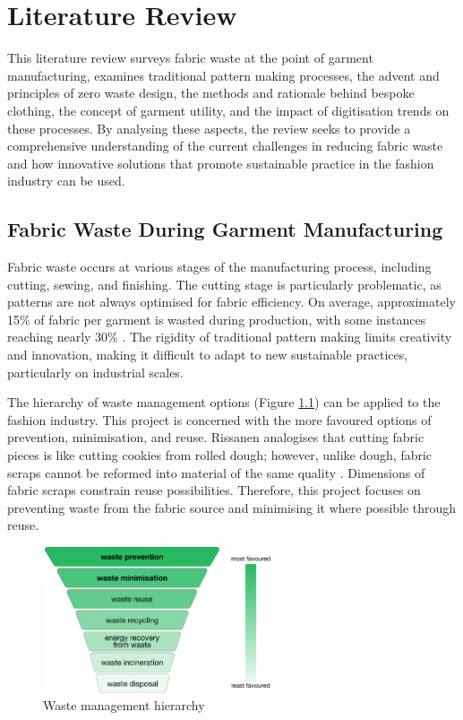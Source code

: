 \chapter{Literature Review}
This literature review surveys fabric waste at the point of garment manufacturing, examines traditional pattern making processes, the advent and principles of zero waste design, the methods and rationale behind bespoke clothing, the concept of garment utility, and the impact of digitisation trends on these processes. By analysing these aspects, the review seeks to provide a comprehensive understanding of the current challenges in reducing fabric waste and how innovative solutions that promote sustainable practice in the fashion industry can be used.

\section{Fabric Waste During Garment Manufacturing}
Fabric waste occurs at various stages of the manufacturing process, including cutting, sewing, and finishing. The cutting stage is particularly problematic, as patterns are not always optimised for fabric efficiency. On average, approximately 15\% of fabric per garment is wasted during production, with some instances reaching nearly 30\% \cite{black_sustainable_2013}. The rigidity of traditional pattern making limits creativity and innovation, making it difficult to adapt to new sustainable practices, particularly on industrial scales.

The hierarchy of waste management options (Figure \ref{fig:waste_hierarchy}) can be applied to the fashion industry. This project is concerned with the more favoured options of prevention, minimisation, and reuse. Rissanen analogises that cutting fabric pieces is like cutting cookies from rolled dough; however, unlike dough, fabric scraps cannot be reformed into material of the same quality \cite{rissanen_zero-waste_2013}. Dimensions of fabric scraps constrain reuse possibilities. Therefore, this project focuses on preventing waste from the fabric source and minimising it where possible through reuse.
\begin{figure} [htb]
    \centering
    \includegraphics[width=0.6\textwidth]{Images/waste hierarchy.png}
    \caption{Waste management hierarchy \cite{rissanen_zero-waste_2013,mcdougall_integrated_2001}}
    \label{fig:waste_hierarchy}
\end{figure}


